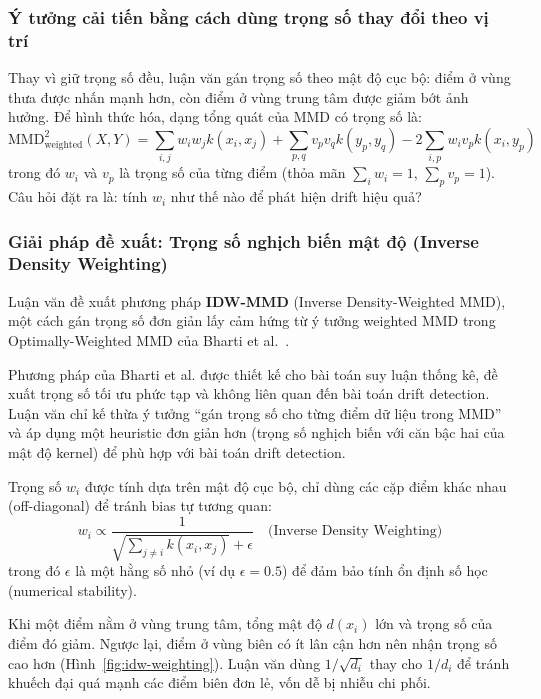 \subsubsection{Ý tưởng cải tiến bằng cách dùng trọng số thay đổi theo vị trí}
Thay vì giữ trọng số đều, luận văn gán trọng số theo mật độ cục bộ: điểm ở vùng thưa được nhấn mạnh hơn, còn điểm ở vùng trung tâm được giảm bớt ảnh hưởng. Để hình thức hóa, dạng tổng quát của MMD có trọng số là:
\begin{equation}
	\text{MMD}^2_{\text{weighted}}(X, Y) = \sum_{i,j} w_i w_j k(x_i, x_j) + \sum_{p,q} v_p v_q k(y_p, y_q) - 2\sum_{i,p} w_i v_p k(x_i, y_p)
\end{equation}
trong đó $w_i$ và $v_p$ là trọng số của từng điểm (thỏa mãn $\sum_i w_i = 1$, $\sum_p v_p = 1$). Câu hỏi đặt ra là: tính $w_i$ như thế nào để phát hiện drift hiệu quả?

\subsubsection{Giải pháp đề xuất: Trọng số nghịch biến mật độ (Inverse Density Weighting)}
Luận văn đề xuất phương pháp \textbf{IDW-MMD} (Inverse Density-Weighted MMD), một cách gán trọng số đơn giản lấy cảm hứng từ ý tưởng weighted MMD trong Optimally-Weighted MMD của Bharti et al.~\cite{bharti2023owmmd}.

Phương pháp của Bharti et al. được thiết kế cho bài toán suy luận thống kê, đề xuất trọng số tối ưu phức tạp và không liên quan đến bài toán drift detection. Luận văn chỉ kế thừa ý tưởng ``gán trọng số cho từng điểm dữ liệu trong MMD'' và áp dụng một heuristic đơn giản hơn (trọng số nghịch biến với căn bậc hai của mật độ kernel) để phù hợp với bài toán drift detection.

Trọng số $w_i$ được tính dựa trên mật độ cục bộ, chỉ dùng các cặp điểm khác nhau (off-diagonal) để tránh bias tự tương quan:
\begin{equation}
	w_i \propto \frac{1}{\sqrt{\sum_{j \neq i} k(x_i, x_j)} + \epsilon} \quad \text{(Inverse Density Weighting)}
\end{equation}
trong đó $\epsilon$ là một hằng số nhỏ (ví dụ $\epsilon = 0.5$) để đảm bảo tính ổn định số học (numerical stability).

Khi một điểm nằm ở vùng trung tâm, tổng mật độ $d(x_i)$ lớn và trọng số của điểm đó giảm. Ngược lại, điểm ở vùng biên có ít lân cận hơn nên nhận trọng số cao hơn (Hình~\ref{fig:idw-weighting}). Luận văn dùng $1/\sqrt{d_i}$ thay cho $1/d_i$ để tránh khuếch đại quá mạnh các điểm biên đơn lẻ, vốn dễ bị nhiễu chi phối.

